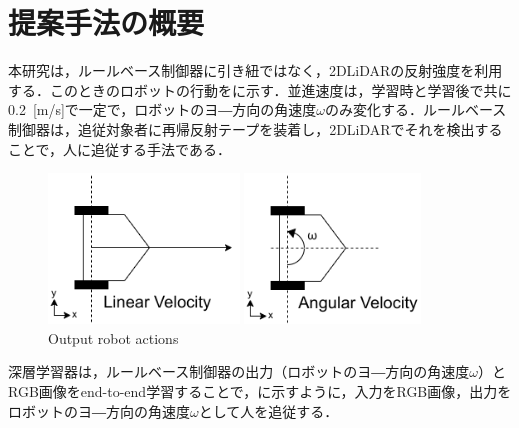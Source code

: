 
\section{提案手法の概要}

  本研究は，ルールベース制御器に引き紐ではなく，2DLiDARの反射強度を利用する．このときのロボットの行動をに示す．並進速度は，学習時と学習後で共に0.2 \,[m/s]で一定で，ロボットのヨ―方向の角速度$\omega$のみ変化する．ルールベース制御器は，追従対象者に再帰反射テープを装着し，2DLiDARでそれを検出することで，人に追従する手法である．

  \begin{figure}[h]
    \centering
    \begin{minipage}[c]{65mm} 
        \centering
        \includegraphics[height=40mm]{images/RobotGuidance_linear_velocity.png}
    \end{minipage}
    \begin{minipage}[c]{65mm} 
        \centering
        \includegraphics[height=40mm]{images/RobotGuidance_angular_velocity.png}
    \end{minipage}
    \caption{Output robot actions}
    \label{Fig:RobotGuidance_velocity}
  \end{figure}

\newpage

  深層学習器は，ルールベース制御器の出力（ロボットのヨ―方向の角速度$\omega$）とRGB画像をend-to-end学習することで，に示すように，入力をRGB画像，出力をロボットのヨ―方向の角速度$\omega$として人を追従する．

